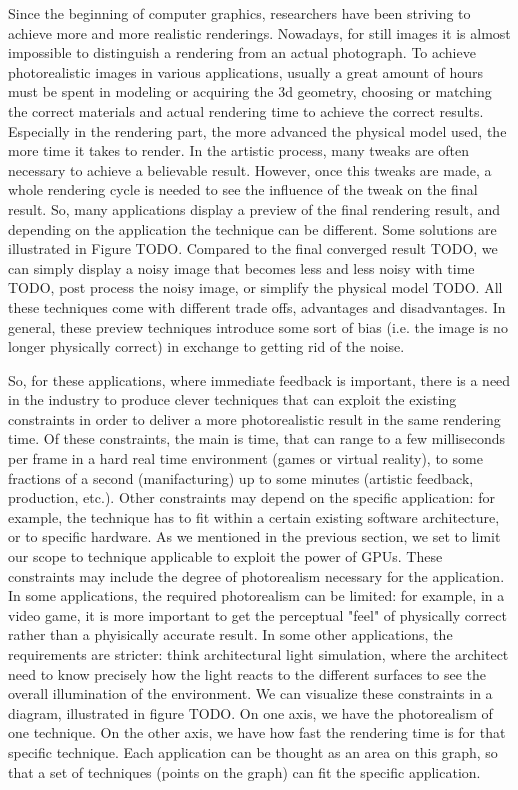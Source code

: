Since the beginning of computer graphics, researchers have been striving to achieve more and more realistic renderings. Nowadays, for still images it is almost impossible to distinguish a rendering from an actual photograph. To achieve photorealistic images in various applications, usually a great amount of hours must be spent in modeling or acquiring the 3d geometry, choosing or matching the correct materials and actual rendering time to achieve the correct results. Especially in the rendering part, the more advanced the physical model used, the more time it takes to render. In the artistic process, many tweaks are often necessary to achieve a believable result. However, once this tweaks are made, a whole rendering cycle is needed to see the influence of the tweak on the final result. So, many applications display a preview of the final rendering result, and depending on the application the technique can be different. Some solutions are illustrated in Figure TODO. Compared to the final converged result TODO, we can simply display a noisy image that becomes less and less noisy with time TODO, post process the noisy image, or simplify the physical model TODO. All these techniques come with different trade offs, advantages and disadvantages. In general, these preview techniques introduce some sort of bias (i.e. the image is no longer physically correct) in exchange to getting rid of the noise. \

So, for these applications, where immediate feedback is important, there is a need in the industry to produce clever techniques that can exploit the existing constraints in order to deliver a more photorealistic result in the same rendering time. Of these constraints, the main is time, that can range to a few milliseconds per frame in a hard real time environment (games or virtual reality), to some fractions of a second (manifacturing) up to some minutes (artistic feedback, production, etc.). Other constraints may depend on the specific application: for example, the technique has to fit within a certain existing software architecture, or to specific hardware. As we mentioned in the previous section, we set to limit our scope to technique applicable to exploit the power of GPUs. These constraints may include the degree of photorealism necessary for the application. In some applications, the required photorealism can be limited: for example, in a video game, it is more important to get the perceptual "feel" of physically correct rather than a phyisically accurate result. In some other applications, the requirements are stricter: think architectural light simulation, where the architect need to know precisely how the light reacts to the different surfaces to see the overall illumination of the environment. We can visualize these constraints in a diagram, illustrated in figure TODO. On one axis, we have the photorealism of one technique. On the other axis, we have how fast the rendering time is for that specific technique. Each application can be thought as an area on this graph, so that a set of techniques (points on the graph) can fit the specific application.

